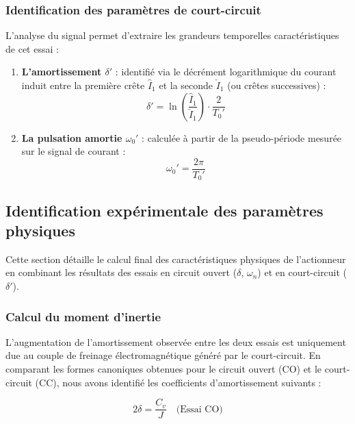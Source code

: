 \subsubsection{Identification des paramètres de court-circuit}

L'analyse du signal permet d'extraire les grandeurs temporelles caractéristiques de cet essai :
\begin{enumerate}
    \item \textbf{L'amortissement $\delta'$} : identifié via le décrément logarithmique du courant induit entre la première crête $\hat{I}_1$ et la seconde $\check{I}_1$ (ou crêtes successives) :
    \begin{equation}
    \delta' = \ln\left( \frac{\hat{I}_1}{\check{I}_1} \right) \cdot \frac{2}{T_0'}
    \label{eq:calc_deltap}
    \end{equation}
    \item \textbf{La pulsation amortie $\omega_0'$} : calculée à partir de la pseudo-période mesurée sur le signal de courant :
    \begin{equation}
    \omega_0' = \frac{2\pi}{T_0'}
    \label{eq:calc_omega0p}
    \end{equation}
\end{enumerate}

\subsection{Identification expérimentale des paramètres physiques}

Cette section détaille le calcul final des caractéristiques physiques de l'actionneur en combinant les résultats des essais en circuit ouvert ($\delta$, $\omega_n$) et en court-circuit ($\delta'$).

\subsubsection{Calcul du moment d'inertie}

L'augmentation de l'amortissement observée entre les deux essais est uniquement due au couple de freinage électromagnétique généré par le court-circuit. En comparant les formes canoniques obtenues pour le circuit ouvert (CO) et le court-circuit (CC), nous avons identifié les coefficients d'amortissement suivants :

\begin{equation}
2\delta = \frac{C_v}{J} \quad \text{(Essai CO)}
\end{equation}

